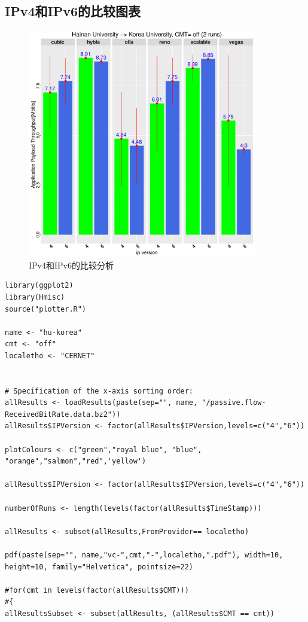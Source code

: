 \documentclass[a4paper,12pt]{ctexbook}
\begin{document}
\begin{flushleft}
\section{IPv4和IPv6的比较图表}
\begin{figure}[H]
	\begin{center}
		\includegraphics[width=10cm]{NorNet示例/vc-hu-korea/hu-koreavc-mptcp-CERNET.pdf}
		\caption{IPv4和IPv6的比较分析}
	\end{center}
\end{figure}
\begin{verbatim}
library(ggplot2)
library(Hmisc)
source("plotter.R")

name <- "hu-korea"
cmt <- "off"
localetho <- "CERNET"


# Specification of the x-axis sorting order:
allResults <- loadResults(paste(sep="", name, "/passive.flow-ReceivedBitRate.data.bz2"))
allResults$IPVersion <- factor(allResults$IPVersion,levels=c("4","6"))

plotColours <- c("green","royal blue", "blue", "orange","salmon","red",'yellow')

allResults$IPVersion <- factor(allResults$IPVersion,levels=c("4","6"))

numberOfRuns <- length(levels(factor(allResults$TimeStamp)))

allResults <- subset(allResults,FromProvider== localetho)

pdf(paste(sep="", name,"vc-",cmt,"-",localetho,".pdf"), width=10, height=10, family="Helvetica", pointsize=22)

#for(cmt in levels(factor(allResults$CMT))) 
#{
allResultsSubset <- subset(allResults, (allResults$CMT == cmt))


\end{verbatim}
\end{flushleft}
\end{document}
